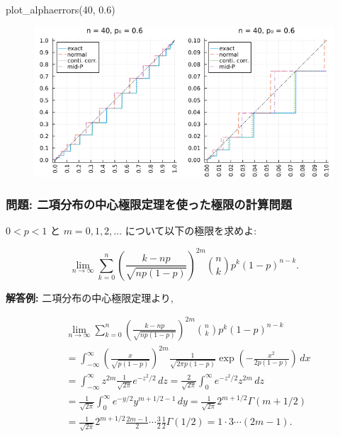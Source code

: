 \documentclass[
  letterpaper,
  DIV=11,
  numbers=noendperiod]{scrartcl}
\newenvironment{Shaded}{\begin{snugshade}}{\end{snugshade}}
\newcommand{\FloatTok}[1]{\textcolor[rgb]{0.68,0.00,0.00}{#1}}
\newcommand{\FunctionTok}[1]{\textcolor[rgb]{0.28,0.35,0.67}{#1}}
\newcommand{\NormalTok}[1]{\textcolor[rgb]{0.00,0.23,0.31}{#1}}
\begin{document}
\begin{Shaded}
\begin{Highlighting}[]
\FunctionTok{plot\_alphaerrors}\NormalTok{(}\FloatTok{40}\NormalTok{, }\FloatTok{0.6}\NormalTok{)}
\end{Highlighting}
\end{Shaded}

\begin{figure}[H]

{\centering \includegraphics{05 Central limit theorem_files/figure-pdf/cell-65-output-1.png}

}

\end{figure}

\hypertarget{ux554fux984c-ux4e8cux9805ux5206ux5e03ux306eux4e2dux5fc3ux6975ux9650ux5b9aux7406ux3092ux4f7fux3063ux305fux6975ux9650ux306eux8a08ux7b97ux554fux984c}{%
\subsubsection{問題:
二項分布の中心極限定理を使った極限の計算問題}\label{ux554fux984c-ux4e8cux9805ux5206ux5e03ux306eux4e2dux5fc3ux6975ux9650ux5b9aux7406ux3092ux4f7fux3063ux305fux6975ux9650ux306eux8a08ux7b97ux554fux984c}}

\(0 < p < 1\) と \(m=0,1,2,\ldots\) について以下の極限を求めよ:

\[
\lim_{n\to\infty}
\sum_{k=0}^n
\left(\frac{k - np}{\sqrt{np(1-p)}}\right)^{2m}
\binom{n}{k}p^k(1-p)^{n-k}.
\]

\textbf{解答例:} 二項分布の中心極限定理より,

\[
\begin{aligned}
&
\lim_{n\to\infty}
\sum_{k=0}^n
\left(\frac{k - np}{\sqrt{np(1-p)}}\right)^{2m}
\binom{n}{k}p^k(1-p)^{n-k}
\\ &=
\int_{-\infty}^\infty
\left(\frac{x}{\sqrt{p(1-p)}}\right)^{2m}
\frac{1}{\sqrt{2\pi p(1-p)}}
\exp\left(-\frac{x^2}{2p(1-p)}\right)\,dx
\\ &=
\int_{-\infty}^\infty
z^{2m}\frac{1}{\sqrt{2\pi}}e^{-z^2/2}\,dz =
\frac{2}{\sqrt{2\pi}}\int_0^\infty e^{-z^2/2} z^{2m}\,dz
\\ &=
\frac{1}{\sqrt{2\pi}}\int_0^\infty e^{-y/2} y^{m+1/2-1}\,dy =
\frac{1}{\sqrt{2\pi}} 2^{m+1/2} \Gamma(m+1/2)
\\ &=
\frac{1}{\sqrt{2\pi}} 2^{m+1/2}
\frac{2m-1}{2}\cdots\frac{3}{2}\frac{1}{2}\Gamma(1/2) =
1\cdot 3\cdots (2m-1).
\end{aligned}
\]
\end{document}
